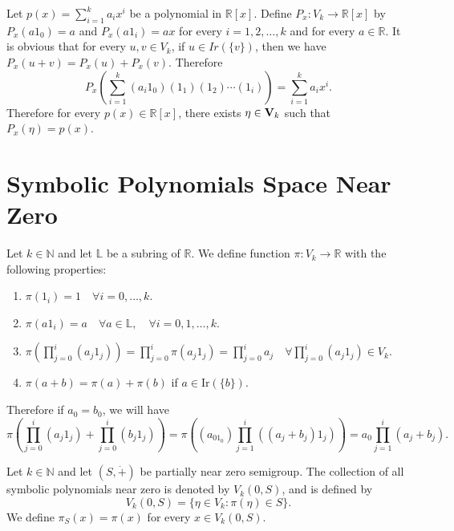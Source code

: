\documentclass[twoside,11pt]{article}
\newcommand{\V}{{\bf{V}}}
\begin{document}
\begin{remark}
	Let $p(x)=\sum_{i=1}^ka_ix^i$ be a polynomial in $\mathbb{R}[x]$.  Define $P_x:V_k\to \mathbb{R}[x]$ by $P_x(a1_0)=a$ and $P_x(a1_i)=ax$ for every $i=1,2,\ldots,k$ and for every $a\in \mathbb{R}$. It is obvious that for every $u,v\in V_k$, if $u\in Ir(\{v\})$, then we have $P_x(u+v)=P_x(u)+P_x(v)$. Therefore
	\[
	P_x(\sum_{i=1}^k(a_i1_0)(1_1)(1_2)\cdots(1_i))=\sum_{i=1}^ka_ix^i.
	\]
	Therefore for every $p(x)\in\mathbb{R}[x]$, there exists $\eta\in \V_k$ such that $P_x(\eta)=p(x)$.
\end{remark}



\section{Symbolic Polynomials Space Near Zero}
\begin{definition}
	Let $k\in\mathbb{N}$ and let $\mathbb{L}$ be a subring of $\mathbb{R}$. We define function $\pi:V_k\to \mathbb{R}$ with the following properties:
	\begin{enumerate}[label=(\alph*)]
		\item 
		\(\pi(1_i) = 1 \quad \forall i=0,\ldots,k\).
		\item 
		\(\pi(a1_i) = a \quad \forall a\in \mathbb{L}, \quad \forall i=0,1,\ldots,k\).
		\item 
		\(\pi\left(\prod_{j=0}^i (a_j 1_j)\right) = \prod_{j=0}^i \pi(a_j 1_j) = \prod_{j=0}^i a_j \quad \forall \prod_{j=0}^i (a_j 1_j)\in V_k\).
		\item 
		$\pi(a+b) = \pi(a) + \pi(b)$ if $a\in \mathrm{Ir}(\{b\})$.
	\end{enumerate}
	Therefore if $a_0=b_0$, we will have 
	\[
	\pi\left(\prod_{j=0}^i (a_j 1_j) + \prod_{j=0}^i (b_j 1_j)\right) = \pi\left((a_01_0)\prod_{j=1}^i ((a_j+b_j) 1_j)\right) = a_0 \prod_{j=1}^i (a_j+b_j).
	\]
\end{definition}

\begin{definition}
	Let $k\in\mathbb{N}$ and let $(S,\dot{+})$ be partially near zero semigroup. The collection of all symbolic polynomials near zero is denoted by $V_k(0,S)$, and is defined by 
	\[
	V_k(0,S)=\{\eta\in V_k:\pi(\eta)\in S\}.
	\]
	We define $\pi_S(x)=\pi(x)$ for every $x\in V_k(0,S)$.
\end{definition}
\end{document}
